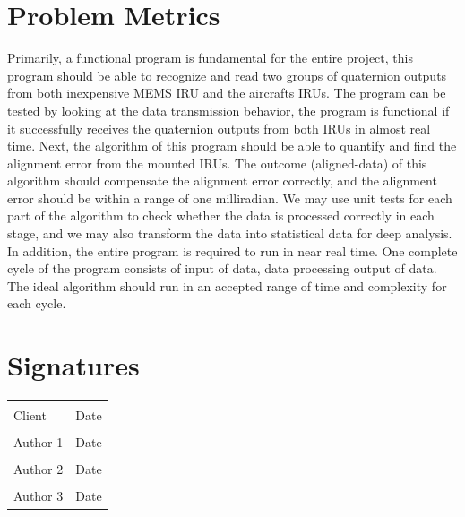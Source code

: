 \documentclass[letterpaper,10pt,notitlepage]{article}
\begin{document}
\section*{Problem Metrics}
Primarily, a functional program is fundamental for the entire project, this program should be able to recognize and read two groups of quaternion outputs from both inexpensive MEMS IRU and the aircraft\textquotesingle s IRUs. The program can be tested by looking at the data transmission behavior, the program is functional if it successfully receives the quaternion outputs from both IRUs in almost real time. Next, the algorithm of this program should be able to quantify and find the alignment error from the mounted IRUs. The outcome (aligned-data) of this algorithm should compensate the alignment error correctly, and the alignment error should be within a range of one milliradian. We may use unit tests for each part of the algorithm to check whether the data is processed correctly in each stage, and we may also transform the data into statistical data for deep analysis. In addition, the entire program is required to run in near real time. One complete cycle of the program consists of input of data, data processing output of data. The ideal algorithm should run in an accepted range of time and complexity for each cycle. 


\newpage
\nocite{*}




\newpage
	\section*{Signatures}
	\noindent\begin{tabular}{ll}
	\\[1cm]
	\makebox[2.5in]{\hrulefill} & \makebox[2.5in]{\hrulefill}\\
	Client & Date\\[8ex]%
	\makebox[2.5in]{\hrulefill} & \makebox[2.5in]{\hrulefill}\\
	Author 1 & Date\\[8ex]%
	\makebox[2.5in]{\hrulefill} & \makebox[2.5in]{\hrulefill}\\
	Author 2 & Date\\[8ex]%
	\makebox[2.5in]{\hrulefill} & \makebox[2.5in]{\hrulefill}\\
	Author 3 & Date\\[8ex]%
	\end{tabular}
\end{document}
